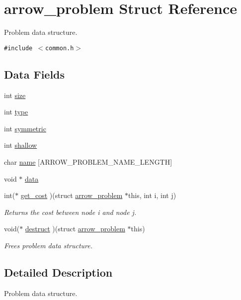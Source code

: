 \hypertarget{structarrow__problem}{
\section{arrow\_\-problem Struct Reference}
\label{structarrow__problem}
}
Problem data structure.  


{\tt \#include $<$common.h$>$}

\subsection*{Data Fields}
\begin{CompactItemize}
\item 
int \hyperlink{structarrow__problem_de8573ddc391d06b08b65923fca693ec}{size}
\item 
int \hyperlink{structarrow__problem_42c44f8d75c6e7a1c7440ac472b8594b}{type}
\item 
int \hyperlink{structarrow__problem_168ab92e9d7a873740a2550f4d3510d9}{symmetric}
\item 
int \hyperlink{structarrow__problem_8c3f4f7794c1430440658d69151b296d}{shallow}
\item 
char \hyperlink{structarrow__problem_8b7fec7ddd0462d3d841b87e287cff9f}{name} \mbox{[}ARROW\_\-PROBLEM\_\-NAME\_\-LENGTH\mbox{]}
\item 
void $\ast$ \hyperlink{structarrow__problem_6dbeb0f93e110adf45096c7457cd588d}{data}
\item 
int($\ast$ \hyperlink{structarrow__problem_4f1f4c9ef90f240b248e8f39360da769}{get\_\-cost} )(struct \hyperlink{structarrow__problem}{arrow\_\-problem} $\ast$this, int i, int j)
\begin{CompactList}\small\item\em Returns the cost between node i and node j. \item\end{CompactList}\item 
void($\ast$ \hyperlink{structarrow__problem_ff7c7873a7e7130a16e2a49da20ee625}{destruct} )(struct \hyperlink{structarrow__problem}{arrow\_\-problem} $\ast$this)
\begin{CompactList}\small\item\em Frees problem data structure. \item\end{CompactList}\end{CompactItemize}


\subsection{Detailed Description}
Problem data structure. 


